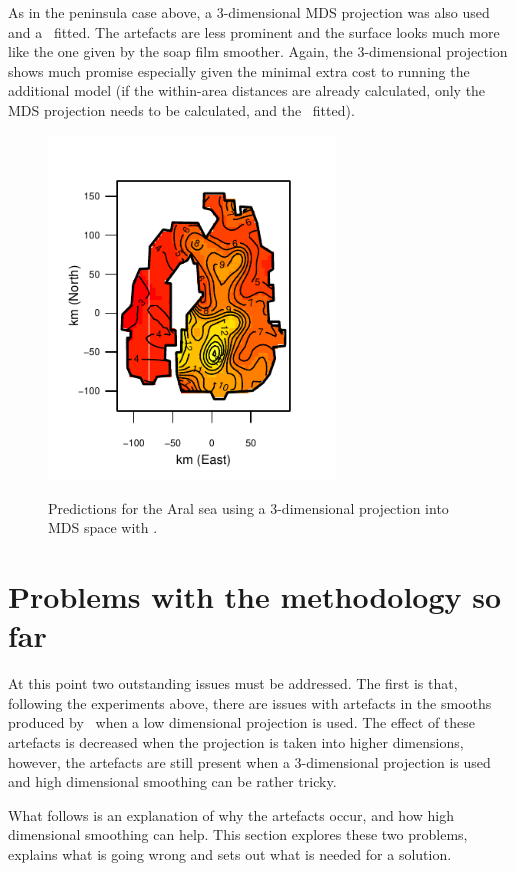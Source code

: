 As in the peninsula case above, a 3-dimensional MDS projection was also used and a \tprs\ fitted. The artefacts are less prominent and the surface looks much more like the one given by the soap film smoother. Again, the 3-dimensional projection shows much promise especially given the minimal extra cost to running the additional model (if the within-area distances are already calculated, only the MDS projection needs to be calculated, and the \tprs\ fitted).

\begin{figure}
\centering
\includegraphics[width=3in]{mds/figs/aral-3d.pdf} \\
\caption{Predictions for the Aral sea using a 3-dimensional projection into MDS space with \mdsap.}
\label{aral-fit-3d}
\end{figure}

\section{Problems with the methodology so far}
\label{mds-problems}

At this point two outstanding issues must be addressed. The first is that, following the experiments above, there are issues with artefacts in the smooths produced by \mdsap\ when a low dimensional projection is used. The effect of these artefacts is decreased when the projection is taken into higher dimensions, however, the artefacts are still present when a 3-dimensional projection is used and high dimensional smoothing can be rather tricky. 

What follows is an explanation of why the artefacts occur, and how high dimensional smoothing can help. This section explores these two problems, explains what is going wrong and sets out what is needed for a solution.

